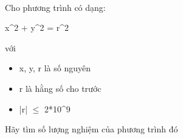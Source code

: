  

Cho phương trình có dạng:

x^2 + y^2 = r^2

với
\begin{itemize}
	\item x, y, r là số nguyên
	\item r là hằng số cho trước
	\item |r|  $\le$  2*10^9
\end{itemize}

Hãy tìm số lượng nghiệm của phương trình đó